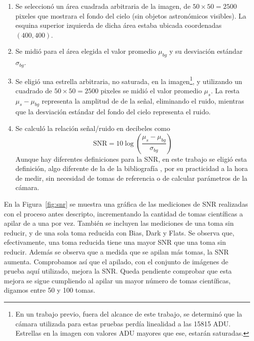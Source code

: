 \documentclass[a4paper, 12pt]{article}
\begin{document}
\begin{enumerate}
\item Se seleccionó un área cuadrada arbitraria de la imagen, de $50\times50=2500$ pixeles que mostrara el fondo del cielo (sin objetos astronómicos visibles). La esquina superior izquierda de dicha área estaba ubicada coordenadas $(400,400)$.
\item Se midió para el área elegida el valor promedio $\mu_{bg}$ y su desviación estándar $\sigma_{bg}$.
\item Se eligió una estrella arbitraria, no saturada, en la imagen\footnote{En un trabajo previo, fuera del alcance de este trabajo, se determinó que la cámara utilizada para estas pruebas perdía linealidad a las 15815 ADU. Estrellas en la imagen con valores ADU mayores que ese, estarán saturadas.}, y utilizando un cuadrado de  $50\times50=2500$ pixeles se midió el valor promedio $\mu_s$. La resta $\mu_s - \mu_{bg}$ representa la amplitud de de la señal, eliminando el ruido, mientras que la desviación estándar del fondo del cielo representa el ruido.
\item Se calculó la relación señal/ruido en decibeles como $$\mbox{SNR}=10 \log{\left(\frac{\mu_s - \mu_{bg}}{\sigma_{bg}}\right)}$$ Aunque hay diferentes definiciones para la SNR, en este trabajo se eligió esta definición, algo diferente de la de la bibliografía \cite{easton, romanishin}, por su practicidad a la hora de medir, sin necesidad de tomas de referencia o de calcular parámetros de la cámara.
\end{enumerate}

En la Figura~\ref{fig:snr} se muestra una gráfica de las mediciones de SNR realizadas con el proceso antes descripto, incrementando la cantidad de tomas científicas a apilar de a una por vez. También se incluyen las mediciones de una toma sin reducir, y de una sola toma reducida con Bias, Dark y Flats. Se observa que, efectivamente, una toma reducida tiene una mayor SNR que una toma sin reducir. Además se observa que a medida que se apilan más tomas, la SNR aumenta. Comprobamos así que el apilado, con el conjunto de imágenes de prueba aquí utilizado, mejora la SNR. Queda pendiente comprobar que esta mejora se sigue cumpliendo al apilar un mayor número de tomas científicas, digamos entre 50 y 100 tomas.
\end{document}
